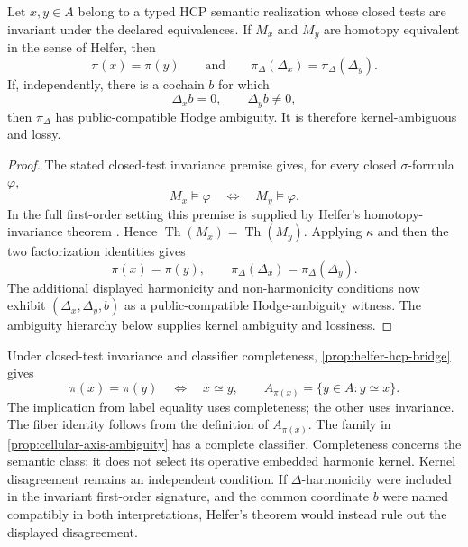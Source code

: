 \begin{proposition}\label{prop:helfer-hcp-bridge}
  Let \(x,y\in A\) belong to a typed HCP semantic realization whose closed
  tests are invariant under the declared equivalences. If \(M_x\) and
  \(M_y\) are homotopy equivalent in the sense of Helfer, then
  \[
    \pi(x)=\pi(y)
    \qquad\text{and}\qquad
    \pi_\Delta(\Delta_x)=\pi_\Delta(\Delta_y).
  \]
  If, independently, there is a cochain \(b\) for which
  \[
    \Delta_xb=0,
    \qquad
    \Delta_yb\ne0,
  \]
  then \(\pi_\Delta\) has public-compatible Hodge ambiguity. It is therefore
  kernel-ambiguous and lossy.
\end{proposition}

\begin{proof}
  The stated closed-test invariance premise gives, for every closed
  \(\sigma\)-formula \(\varphi\),
  \[
    M_x\vDash\varphi
    \quad\Longleftrightarrow\quad
    M_y\vDash\varphi.
  \]
  In the full first-order setting this premise is supplied by Helfer's
  homotopy-invariance theorem \cite[Theorem~12.3]{helfer2019fol}.
  Hence \(\operatorname{Th}(M_x)=\operatorname{Th}(M_y)\). Applying
  \(\kappa\) and then the two factorization identities gives
  \[
    \pi(x)=\pi(y),
    \qquad
    \pi_\Delta(\Delta_x)=\pi_\Delta(\Delta_y).
  \]
  The additional displayed harmonicity and non-harmonicity conditions now
  exhibit \((\Delta_x,\Delta_y,b)\) as a public-compatible Hodge-ambiguity
  witness. The ambiguity hierarchy below supplies kernel ambiguity and
  lossiness.
\end{proof}

Under closed-test invariance and classifier completeness,
\cref{prop:helfer-hcp-bridge} gives
\[
  \pi(x)=\pi(y)\quad\Longleftrightarrow\quad x\simeq y,
  \qquad
  A_{\pi(x)}=\{y\in A:y\simeq x\}.
\]
The implication from label equality uses completeness; the other uses
invariance. The fiber identity follows from the definition of \(A_{\pi(x)}\).
The family in \cref{prop:cellular-axis-ambiguity} has a complete classifier.
Completeness concerns the semantic class; it does not select its operative
embedded harmonic kernel. Kernel disagreement remains an independent condition. If
\(\Delta\)-harmonicity were included in the invariant first-order signature,
and the common coordinate \(b\) were
named compatibly in both interpretations, Helfer's theorem would instead rule
out the displayed disagreement.

